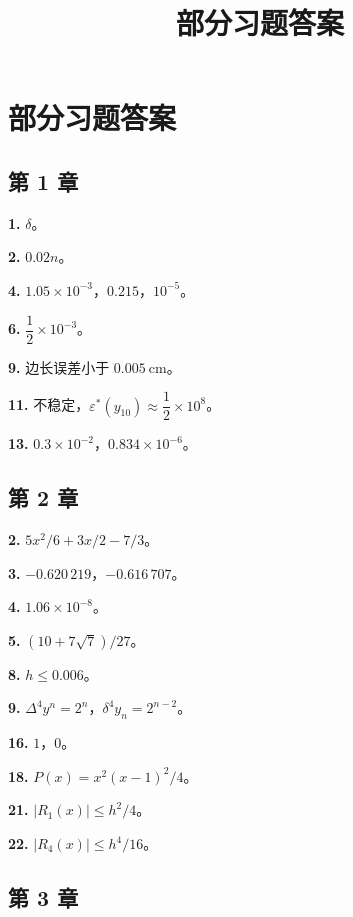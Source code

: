 \documentclass[
  10pt,
  fontset=fandol]{ctexart}
\title{部分习题答案}
\author{}
\date{}
\begin{document}
\maketitle

\section{部分习题答案}\label{ux90e8ux5206ux4e60ux9898ux7b54ux6848}

\subsection{第 1 章}\label{ux7b2c-1-ux7ae0}

\textbf{1.} \(\delta\)。

\textbf{2.} \(0.02n\)。

\textbf{4.} \(1.05\times10^{-3}\)，\(0.215\)，\(10^{-5}\)。

\textbf{6.} \(\dfrac{1}{2}\times10^{-3}\)。

\textbf{9.} 边长误差小于 \(0.005\ \mathrm{cm}\)。

\textbf{11.} 不稳定，\(\varepsilon^*(y_{10})\approx\dfrac{1}{2}\times10^8\)。

\textbf{13.} \(0.3\times10^{-2}\)，\(0.834\times10^{-6}\)。

\subsection{第 2 章}\label{ux7b2c-2-ux7ae0}

\textbf{2.} \(5x^2/6+3x/2-7/3\)。

\textbf{3.} \(-0.620\,219\)，\(-0.616\,707\)。

\textbf{4.} \(1.06\times10^{-8}\)。

\textbf{5.} \((10+7\sqrt{7})/27\)。

\textbf{8.} \(h\leqslant0.006\)。

\textbf{9.} \(\Delta^4y^n=2^n\)，\(\delta^4y_n=2^{n-2}\)。

\textbf{16.} \(1\)，\(0\)。

\textbf{18.} \(P(x)=x^2(x-1)^2/4\)。

\textbf{21.} \(|R_1(x)|\leqslant h^2/4\)。

\textbf{22.} \(|R_4(x)|\leqslant h^4/16\)。

\subsection{第 3 章}\label{ux7b2c-3-ux7ae0}
\end{document}
